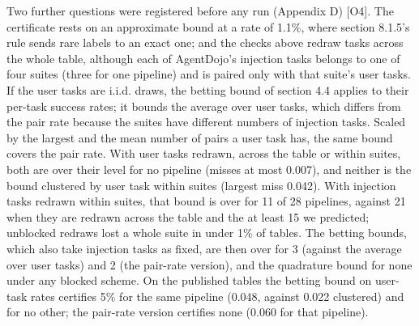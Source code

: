\documentclass[11pt]{article}
\begin{document}
Two further questions were registered before any run (Appendix D) [O4]. The certificate rests on an approximate bound at a rate of 1.1\%, where section 8.1.5's rule sends rare labels to an exact one; and the checks above redraw tasks across the whole table, although each of AgentDojo's injection tasks belongs to one of four suites (three for one pipeline) and is paired only with that suite's user tasks. If the user tasks are i.i.d. draws, the betting bound of section 4.4 applies to their per-task success rates; it bounds the average over user tasks, which differs from the pair rate because the suites have different numbers of injection tasks. Scaled by the largest and the mean number of pairs a user task has, the same bound covers the pair rate. With user tasks redrawn, across the table or within suites, both are over their level for no pipeline (misses at most 0.007), and neither is the bound clustered by user task within suites (largest miss 0.042). With injection tasks redrawn within suites, that bound is over for 11 of 28 pipelines, against 21 when they are redrawn across the table and the at least 15 we predicted; unblocked redraws lost a whole suite in under 1\% of tables. The betting bounds, which also take injection tasks as fixed, are then over for 3 (against the average over user tasks) and 2 (the pair-rate version), and the quadrature bound for none under any blocked scheme. On the published tables the betting bound on user-task rates certifies 5\% for the same pipeline (0.048, against 0.022 clustered) and for no other; the pair-rate version certifies none (0.060 for that pipeline).
\end{document}
